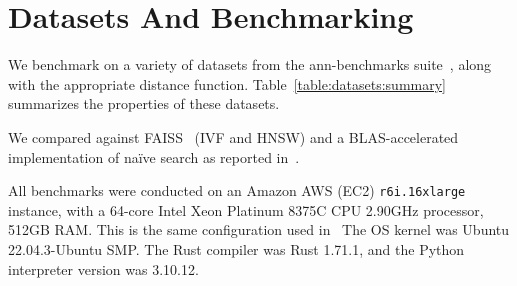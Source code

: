
\section{Datasets And Benchmarking}
\label{sec:datasets-and-benchmarks}

We benchmark on a variety of datasets from the ann-benchmarks suite~\cite{Aumller2018ANNBenchmarksAB}, along with the appropriate distance function.
Table~\ref{table:datasets:summary} summarizes the properties of these datasets.

We compared against FAISS~\cite{johnson2019billion} (IVF and HNSW) and a BLAS-accelerated implementation of na\"ive search as reported in~\cite{johnson2019billion}.

All benchmarks were conducted on an Amazon AWS (EC2) \texttt{r6i.16xlarge} instance, with a 64-core Intel Xeon Platinum 8375C CPU 2.90GHz processor, 512GB RAM.
This is the same configuration used in~\cite{Aumller2018ANNBenchmarksAB}
The OS kernel was Ubuntu 22.04.3-Ubuntu SMP. 
The Rust compiler was Rust 1.71.1, and the Python interpreter version was 3.10.12.

